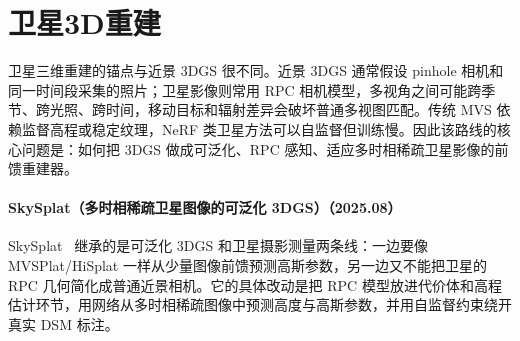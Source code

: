 \section{卫星3D重建}

卫星三维重建的锚点与近景 3DGS 很不同。近景 3DGS 通常假设 pinhole 相机和同一时间段采集的照片；卫星影像则常用 RPC 相机模型，多视角之间可能跨季节、跨光照、跨时间，移动目标和辐射差异会破坏普通多视图匹配。传统 MVS 依赖监督高程或稳定纹理，NeRF 类卫星方法可以自监督但训练慢。因此该路线的核心问题是：如何把 3DGS 做成可泛化、RPC 感知、适应多时相稀疏卫星影像的前馈重建器。


\paragraph{SkySplat（多时相稀疏卫星图像的可泛化 3DGS）（2025.08）}
SkySplat~\cite{2508_09479} 继承的是可泛化 3DGS 和卫星摄影测量两条线：一边要像 MVSPlat/HiSplat 一样从少量图像前馈预测高斯参数，另一边又不能把卫星的 RPC 几何简化成普通近景相机。它的具体改动是把 RPC 模型放进代价体和高程估计环节，用网络从多时相稀疏图像中预测高度与高斯参数，并用自监督约束绕开真实 DSM 标注。

